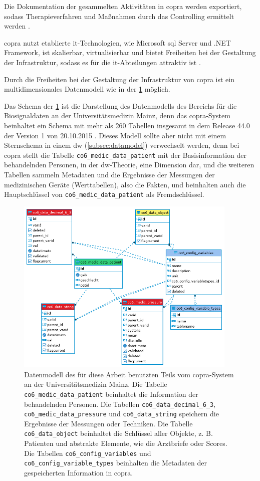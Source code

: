 Die Dokumentation der gesammelten Aktivitäten in \ac{copra} werden exportiert, sodass Therapieverfahren und Maßnahmen durch das Controlling ermittelt werden \cite{copra}.

\ac{copra} nutzt etablierte \ac{it}-Technologien, wie Microsoft \acs{sql} Server und .NET Framework, ist skalierbar, virtualisierbar und bietet Freiheiten bei der Gestaltung der Infrastruktur, sodass es für die \ac{it}-Abteilungen attraktiv ist \cite{copra}.

Durch die Freiheiten bei der Gestaltung der Infrastruktur von \ac{copra} ist ein multidimensionales Datenmodell wie in der \ref{fig:copraschema} möglich. 

Das Schema der \ref{fig:copraschema} ist die Darstellung des Datenmodells des Bereichs für die Biosignaldaten an der Universitätsmedizin Mainz, denn das \ac{copra}-System beinhaltet ein Schema mit mehr als 260 Tabellen insgesamt in dem Release 44.0 der Version 1 von 20.10.2015 \cite{copradoc}. Dieses Modell sollte aber nicht mit einem Sternschema in einem \ac{dw} (\ref{subsec:datamodel}) verwechselt werden, denn bei \ac{copra} stellt die Tabelle \texttt{co6\_medic\_data\_patient} mit der Basisinformation der behandelnden Personen, in der \ac{dw}-Theorie, eine Dimension dar, und die weiteren Tabellen sammeln Metadaten und die Ergebnisse der Messungen der medizinischen Geräte (Werttabellen), also die Fakten, und beinhalten auch die Hauptschlüssel von \texttt{co6\_medic\_data\_patient} als Fremdschlüssel.

\clearpage

\begin{figure}[ht]
	\centering
	\includegraphics[height=8.5cm]{figures/copra_data_model_data}
	\caption[Datenmodell von \acs{copra}]{Datenmodell des für diese Arbeit benutzten Teils vom \ac{copra}-System an der Universitätsmedizin Mainz. Die Tabelle \texttt{co6\_medic\_data\_patient} beinhaltet die Information der behandelnden Personen. Die Tabellen \texttt{co6\_data\_decimal\_6\_3}, \texttt{co6\_medic\_data\_pressure} und \texttt{co6\_data\_string} speichern die Ergebnisse der Messungen oder Techniken. Die Tabelle \texttt{co6\_data\_object} beinhaltet die Schlüssel aller Objekte, z. B. Patienten und abstrakte Elemente, wie die Arztbriefe oder Scores.
	Die Tabellen \texttt{co6\_config\_variables} und \texttt{co6\_config\_variable\_types} beinhalten die Metadaten der gespeicherten Information in \ac{copra}.}
	\label{fig:copraschema}
\end{figure}


